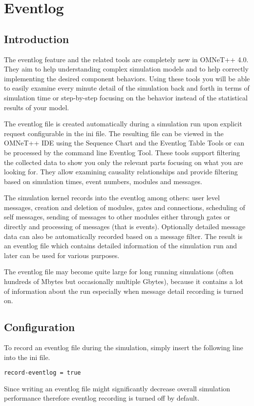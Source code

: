 \chapter{Eventlog}
\label{cha:eventlog}

\section{Introduction}
The eventlog feature and the related tools are completely new in
OMNeT++ 4.0. They aim to help understanding complex simulation models
and to help correctly implementing the desired component
behaviors. Using these tools you will be able to easily examine every
minute detail of the simulation back and forth in terms of simulation
time or step-by-step focusing on the behavior instead of the
statistical results of your model.

The eventlog file is created automatically during a simulation run
upon explicit request configurable in the ini file. The resulting file
can be viewed in the OMNeT++ IDE using the Sequence Chart and the
Eventlog Table Tools or can be processed by the command line Eventlog
Tool. These tools support filtering the collected data to show you
only the relevant parts focusing on what you are looking for. They
allow examining causality relationships and provide filtering based on
simulation times, event numbers, modules and messages.

The simulation kernel records into the eventlog among others: user
level messages, creation and deletion of modules, gates and
connections, scheduling of self messages, sending of messages to other
modules either through gates or directly and processing of messages
(that is events). Optionally detailed message data can also be
automatically recorded based on a message filter. The result is an
eventlog file which contains detailed information of the simulation
run and later can be used for various purposes.

\begin{note}
The eventlog file may become quite large for long running simulations
(often hundreds of Mbytes but occasionally multiple Gbytes), because
it contains a lot of information about the run especially when message
detail recording is turned on.
\end{note}

\section{Configuration}
To record an eventlog file during the simulation, simply insert the
following line into the ini file.
\begin{verbatim}
record-eventlog = true
\end{verbatim}
\begin{note}
Since writing an eventlog file might significantly decrease overall
simulation performance therefore eventlog recording is turned off by
default.
\end{note}

